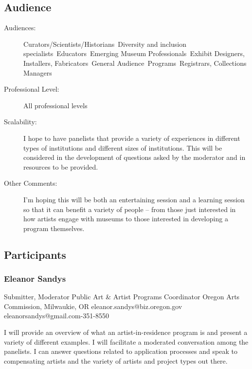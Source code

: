 \documentclass{report}
\begin{document}
              \subsection*{Audience}
                \begin{description}
                  \item [Audiences:]Curators/Scientists/Historians~Diversity and inclusion specialists~Educators~Emerging Museum Professionals~Exhibit Designers, Installers, Fabricators~General Audience~Programs~Registrars, Collections Managers~
                  \item[Professional Level:]All professional levels~
                \item[Scalability:] I hope to have panelists that provide a variety of experiences in different types of institutions and different sizes of institutions. This will be considered in the development of questions asked by the moderator and in resources to be provided.

							
              \item[Other Comments:] I'm hoping this will be both an entertaining session and a learning session so that it can benefit a variety of people -- from those just interested in how artists engage with museums to those interested in developing a program themselves.
              \end{description}
            \subsection*{Participants}
              \subsubsection*{ Eleanor Sandys }
              Submitter, Moderator\newline
              Public Art \& Artist Programs Coordinator\newline
              Oregon Arts Commission, Milwaukie, OR
              \newline
              eleanor.sandys@biz.oregon.gov\newline
              eleanorsandys@gmail.com-351-8550\newline

              I will provide an overview of what an artist-in-residence program is and present a variety of different examples. I will facilitate a moderated conversation among the panelists. I can answer questions related to application processes and speak to compensating artists and the variety of artists and project types out there.\newline
\end{document}
